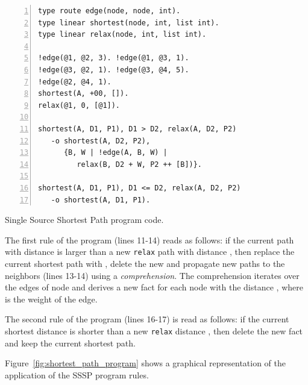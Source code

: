 \begin{topfig}
\begin{Verbatim}[numbers=left,xleftmargin=\codemargin,fontsize=\scriptsize]
type route edge(node, node, int).
type linear shortest(node, int, list int).
type linear relax(node, int, list int).

!edge(@1, @2, 3). !edge(@1, @3, 1).
!edge(@3, @2, 1). !edge(@3, @4, 5).
!edge(@2, @4, 1).
shortest(A, +00, []).
relax(@1, 0, [@1]).

shortest(A, D1, P1), D1 > D2, relax(A, D2, P2)
   -o shortest(A, D2, P2),
      {B, W | !edge(A, B, W) |
         relax(B, D2 + W, P2 ++ [B])}.

shortest(A, D1, P1), D1 <= D2, relax(A, D2, P2)
   -o shortest(A, D1, P1).
\end{Verbatim}
\caption{Single Source Shortest Path program code.}
\label{code:shortest_path_program}
\end{topfig}

The first rule of the program (lines 11-14) reads as follows: if the current
 path  with distance  is larger than a new
\texttt{relax} path with distance , then replace the current shortest
path with , delete the new  and propagate new paths to
the neighbors (lines 13-14) using a \emph{comprehension}.  The comprehension
iterates over the edges of node  and derives a new  fact for
each node  with the distance , where  is the weight
of the edge.

The second rule of the program (lines 16-17) is read as follows: if the
current shortest distance  is shorter than a new \texttt{relax}
distance , then delete the new  fact and keep the current
shortest path.

Figure~\ref{fig:shortest_path_program} shows a graphical representation of the
application of the SSSP program rules.

